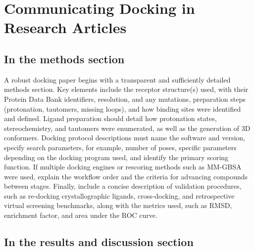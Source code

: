 \documentclass[12pt]{article}
\begin{document}
\section{Communicating Docking in Research Articles}

\subsection{In the methods section}

A robust docking paper begins with a transparent and sufficiently detailed methods section\cite{CH11_Kitchen2004,CH11_Pagadala2017,CH11_Cheng2012}. Key elements include the receptor structure(s) used, with their Protein Data Bank identifiers, resolution, and any mutations, preparation steps (protonation, tautomers, missing loops), and how binding sites were identified and defined\cite{CH11_Berry2015,CH11_Pagadala2017,CH11_zhu2022}.  Ligand preparation should detail how protonation states, stereochemistry, and tautomers were enumerated, as well as the generation of 3D conformers\cite{CH11_Berry2015,CH11_Pagadala2017,CH11_Forli2015}. Docking protocol descriptions must name the software and version, specify search parameters, for example, number of poses, specific parameters depending on the docking program used, and identify the primary scoring function\cite{CH11_Pagadala2017,CH11_AutoDock4}.  If multiple docking engines or rescoring methods such as MM-GBSA were used, explain the workflow order and the criteria for advancing compounds between stages\cite{CH11_Berry2015,CH11_EmpiricalScoring2018,CH11_cosconati2010}. Finally, include a concise description of validation procedures, such as re-docking crystallographic ligands, cross-docking, and retrospective virtual screening benchmarks, along with the metrics used, such as RMSD, enrichment factor, and  area under the ROC curve\cite{CH11_Warren2006,CH11_Forli2015,CH11_ConsensusDocking2023}. 

\subsection{In the results and discussion section}
\end{document}
